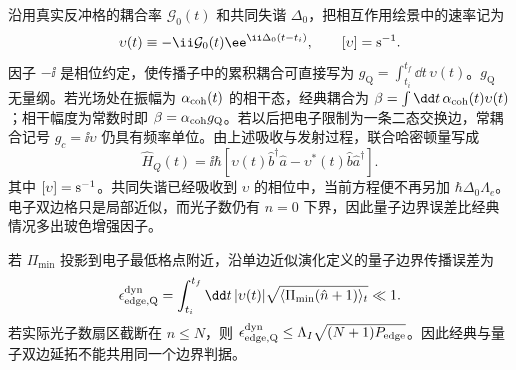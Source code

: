 沿用真实反冲格的耦合率 $\mathcal G_0(t)$ 和共同失谐 $\Delta_0$，把相互作用绘景中的速率记为
\[
\upsilon(t)\equiv-\ii\mathcal G_0(t)\ee^{\ii\Delta_0(t-t_i)},
\qquad [\upsilon]={\rm s^{-1}}.
\]
因子 $-\ii$ 是相位约定，使传播子中的累积耦合可直接写为
$g_{\mathrm Q}=\int_{t_i}^{t_f}\dd t\,\upsilon(t)$。$g_{\mathrm Q}$ 无量纲。若光场处在振幅为 $\alpha_{\rm coh}(t)$ 的相干态，经典耦合为 $\beta=\int\dd t\,\alpha_{\rm coh}(t)\upsilon(t)$；相干幅度为常数时即 $\beta=\alpha_{\rm coh}g_{\mathrm Q}$。若以后把电子限制为一条二态交换边，常耦合记号 $g_c=\ii\upsilon$ 仍具有频率单位。由上述吸收与发射过程，联合哈密顿量写成
\begin{equation}
{
\hat H_Q(t)=\ii\hbar[\upsilon(t)\hat b^\dagger\hat a-\upsilon^*(t)\hat b \hat a^\dagger].}
\label{eq:qpinem-single-mode-hamiltonian-dp68}
\end{equation}
其中 $[\upsilon]={\rm s^{-1}}$。共同失谐已经吸收到 $\upsilon$ 的相位中，当前方程便不再另加 $\hbar\Delta_0\Lambda_e$。电子双边格只是局部近似，而光子数仍有 $n=0$ 下界，因此量子边界误差比经典情况多出玻色增强因子。

若 $\Pi_{\min}$ 投影到电子最低格点附近，沿单边近似演化定义的量子边界传播误差为
\begin{equation}
{
\epsilon_{\rm edge,Q}^{\rm dyn}
=\int_{t_i}^{t_f}\dd t\,|\upsilon(t)|
\sqrt{\langle\Pi_{\min}(\hat n+1)\rangle_t}\ll1.}
\label{eq:quantum_bilateral_ladder_dynamical_error}
\end{equation}
若实际光子数扇区截断在 $n\le N$，则
$\epsilon_{\rm edge,Q}^{\rm dyn}\le\Lambda_I\sqrt{(N+1)P_{\rm edge}}$。因此经典与量子双边延拓不能共用同一个边界判据。

